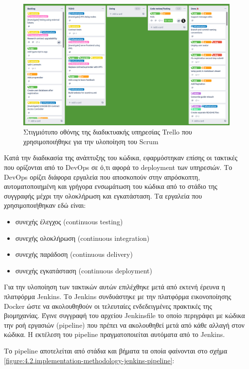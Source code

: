 \begin{figure}[H]
    \centering
    \includegraphics[width=.8\textwidth]{assets/figures/chapter-4/4.2.implementation-methodology-kanban.png}
    \caption{Στιγμιότυπο οθόνης της διαδικτυακής υπηρεσίας Trello που χρησιμοποιήθηκε για την υλοποίηση του Scrum}
    \label{figure:4.2.implementation-methodology-kanban}
\end{figure}

Κατά την διαδικασία της ανάπτυξης του κώδικα, εφαρμόστηκαν επίσης οι τακτικές που ορίζονται από το DevOps σε ό,τι αφορά το deployment των υπηρεσιών. Το DevOps ορίζει διάφορα εργαλεία που αποσκοπούν στην απρόσκοπτη, αυτοματοποιημένη και γρήγορα ενσωμάτωση του κώδικα από το στάδιο της συγγραφής μέχρι την ολοκλήρωση και εγκατάσταση. Τα εργαλεία που χρησιμοποιήθηκαν εδώ είναι:

\begin{itemize}
    \item συνεχής έλεγχος (continuous testing)
    \item συνεχής ολοκλήρωση (continuous integration)
    \item συνεχής παράδοση (continuous delivery)
    \item συνεχής εγκατάσταση (continuous deployment)
\end{itemize}

Για την υλοποίηση των τακτικών αυτών επιλέχθηκε μετά από εκτενή έρευνα η πλατφόρμα Jenkins. Το Jenkins συνδυάστηκε με την πλατφόρμα εικονοποίησης Docker ώστε να ακολουθηθούν οι τελευταίες ενδεδειγμένες πρακτικές της βιομηχανίας. Έγινε συγγραφή του αρχείου Jenkinsfile το οποίο περιγράφει με κώδικα την ροή εργασιών (pipeline) που πρέπει να ακολουθηθεί μετά από κάθε αλλαγή στον κώδικα. Η εκτέλεση του pipeline πραγματοποιείται αυτόματα από το Jenkins.

Το pipeline αποτελείται από στάδια και βήματα τα οποία φαίνονται στο σχήμα \ref{figure:4.2.implementation-methodology-jenkins-pipeline}:

